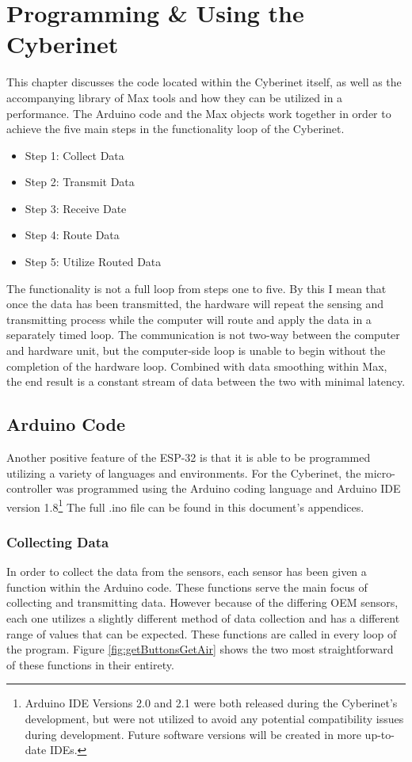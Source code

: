 \chapter{Programming \& Using the Cyberinet}
This chapter discusses the code located within the Cyberinet itself, as well as the accompanying library of Max tools and how they can be utilized in a performance. The Arduino code and the Max objects work together in order to achieve the five main steps in the functionality loop of the Cyberinet. 

\begin{itemize}
    \item Step 1: Collect Data
    \item Step 2: Transmit Data
    \item Step 3: Receive Date
    \item Step 4: Route Data
    \item Step 5: Utilize Routed Data
\end{itemize}

The functionality is not a full loop from steps one to five. By this I mean that once the data has been transmitted, the hardware will repeat the sensing and transmitting process while the computer will route and apply the data in a separately timed loop. The communication is not two-way between the computer and hardware unit, but the computer-side loop is unable to begin without the completion of the hardware loop. Combined with data smoothing within Max, the end result is a constant stream of data between the two with minimal latency.

\section{Arduino Code}
Another positive feature of the ESP-32 is that it is able to be programmed utilizing a variety of languages and environments. For the Cyberinet, the micro-controller was programmed using the Arduino coding language and Arduino IDE version 1.8\footnote{Arduino IDE Versions 2.0 and 2.1 were both released during the Cyberinet's development, but were not utilized to avoid any potential compatibility issues during development. Future software versions will be created in more up-to-date IDEs.} The full .ino file can be found in this document's appendices.

\subsection{Collecting Data}
In order to collect the data from the sensors, each sensor has been given a function within the Arduino code. These functions serve the main focus of collecting and transmitting data. However because of the differing OEM sensors, each one utilizes a slightly different method of data collection and has a different range of values that can be expected. These functions are called in every loop of the program. Figure \ref{fig:getButtonsGetAir} shows the two most straightforward of these functions in their entirety.

